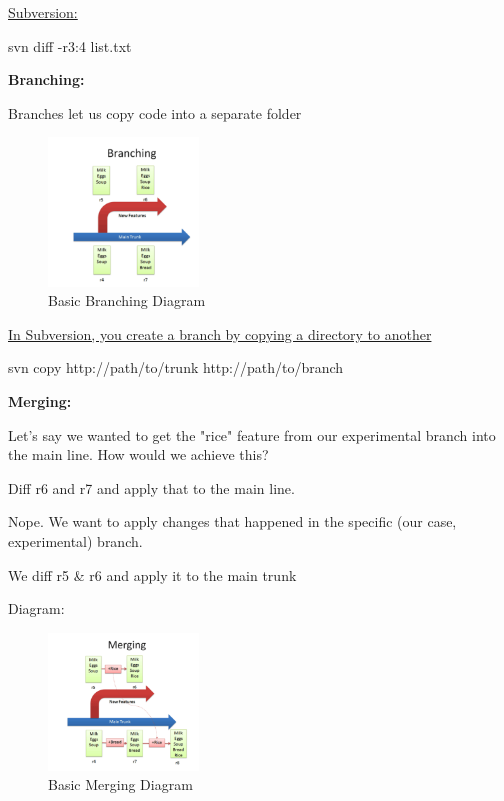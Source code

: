 \documentclass{article}
\begin{document}
\begin{flushleft}
\underline{Subversion:} \\
\par

svn diff -r3:4 list.txt \\
\par

\textbf{Branching:} \\
\par

Branches let us copy code into a separate folder \\
\par

\begin{figure}[htp]
\centering
\includegraphics[width=4cm]{Branching.png}
\caption{Basic Branching Diagram}
\label{fig:BBDiagram}
\end{figure} 

\underline{In Subversion, you create a branch by copying a directory to another} \\
\par

svn copy http://path/to/trunk http://path/to/branch \\
\par

\textbf{Merging:} \\
\par

Let's say we wanted to get the "rice" feature from our experimental branch into the main line. How would we achieve this? \par
Diff r6 and r7 and apply that to the main line. \\
\par

Nope. We want to apply changes that happened in the specific (our case, experimental) branch. \par
We diff r5 \& r6 and apply it to the main trunk \\
\par

Diagram:


\begin{figure}[htp]
\centering
\includegraphics[width=4cm]{Merging.png}
\caption{Basic Merging Diagram}
\label{fig:BMDiagram}
\end{figure} 


\end{flushleft}
\end{document}
